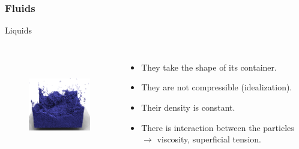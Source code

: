\documentclass[]{beamer}
\begin{document}





\begin{frame}

  \frametitle{Fluids}
  \textcolor{mypink1}{Liquids}
  
  \begin{columns}[c]
    \column{2in}  %
  
  
    \begin{figure}[h!]
      \begin{center}
        \includegraphics[height=1.5in]{images2/0c.png}
        \label{0}
      \end{center}
    \end{figure}
    
  
    \column{2in}
  
  
    \begin{itemize}
      \item They take the shape of its container.
      \pause
      \item They are not compressible (idealization).
      \pause
      \item Their density is constant. 
      \pause
      \item There is interaction between the particles $\rightarrow$ viscosity, superficial tension.
      
      \end{itemize}
  
    \end{columns}
  
  
  
    \end{frame}

\end{document}
